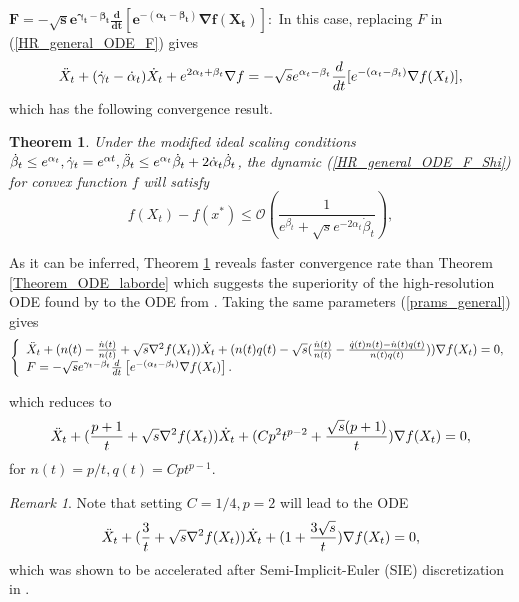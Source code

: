 \documentclass{article}
\theoremstyle{plain}
\newtheorem{theorem}{Theorem}[section]
\theoremstyle{definition}
\theoremstyle{remark}
\newtheorem{remark}{Remark}[theorem]
\begin{document}
     \( \boldsymbol{F = -\sqrt{s}e^{\gamma_t-\beta_t}\frac{d}{dt}\left[e^{-(\alpha_t-\beta_t)}\nabla f(X_t)\right]}:\)
    In this case, replacing $F$ in (\ref{HR_general_ODE_F}) gives
    \begin{align}\label{HR_general_ODE_F_Shi}
    \Ddot{X}_t + (\dot{\gamma}_t-\dot{\alpha}_t)\dot{X}_t+e^{2\alpha_t+\beta_t}\nabla f = -\sqrt{s}e^{\alpha_t-\beta_t}\frac{d}{dt}[e^{-(\alpha_t-\beta_t)}\nabla f(X_t)],
\end{align}
which has the following convergence result. \begin{theorem}\label{Theorem_ODE_Shi}
Under the modified ideal scaling conditions \(\dot\beta_t\leq e^{\alpha_t}, \dot\gamma_t=e^{\alpha t}, \Ddot{\beta}_t\leq e^{\alpha_t}\dot \beta_t + 2\dot \alpha_t \dot \beta_t\), the dynamic (\ref{HR_general_ODE_F_Shi}) for convex function \(f\) will satisfy 
\[f(X_t)-f(x^*)\leq \mathcal{O}(\frac{1}{e^{\beta_t}+\sqrt{s}e^{-2\alpha_t}\dot \beta_t}),\]
\end{theorem}

As it can be inferred, Theorem \ref{Theorem_ODE_Shi} reveals faster convergence rate than Theorem \ref{Theorem_ODE_laborde} which suggests the superiority of the high-resolution ODE found by \citep{Shi2021UnderstandingTA} to the ODE from \citep{pmlr-v108-laborde20a}. Taking the same parameters (\ref{prams_general}) gives
\begin{gather}
    \begin{aligned}\label{HR_cnts_general_npq_SHI}
\left\{
\begin{array}{l}
     \Ddot{X}_t + (n(t)-\frac{\dot n(t)}{n(t)}+\sqrt{s}\nabla^2 f(X_t))\dot{X}_t+(n(t)q(t)-\sqrt{s} (\frac{\dot n(t)}{n(t)}-\frac{\dot q(t)n(t)-\dot n(t)q(t)}{n(t)q(t)}))\nabla f(X_t)=0,   \\
     F = -\sqrt{s}e^{\gamma_t-\beta_t}\frac{d}{dt}\left[e^{-(\alpha_t-\beta_t)}\nabla f(X_t)\right]. 
\end{array}\right.\raisetag{12pt}
\end{aligned}
\end{gather}
 
which reduces to
\begin{align}\label{HR_cnts_general_npq_p}
     \Ddot{X}_t + (\frac{p+1}{t}+\sqrt{s}\nabla^2 f(X_t))\dot{X}_t+(Cp^2t^{p-2}+\frac{\sqrt{s}(p+1)}{t})\nabla f(X_t)=0,
\end{align}
for \(n(t)=p/t,q(t)=Cpt^{p-1}\). 
\begin{remark}
    Note that setting \(C=1/4,p=2\) will lead to the ODE 
\begin{align}\label{HR_cnts_general_stable_ODE}
     \Ddot{X}_t + (\frac{3}{t}+\sqrt{s}\nabla^2 f(X_t))\dot{X}_t+(1+\frac{3\sqrt{s}}{t})\nabla f(X_t)=0,
\end{align}
which was shown to be accelerated after Semi-Implicit-Euler (SIE) discretization in \citep{shi2019acceleration}.
\end{remark}
\end{document}
